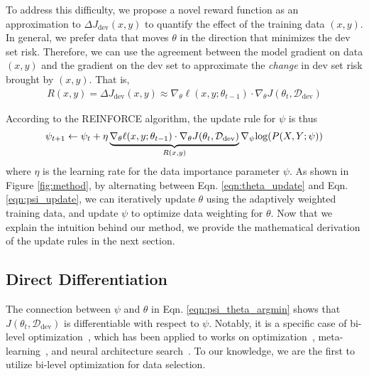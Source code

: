 To address this difficulty, we propose a novel reward function as an approximation to $\Delta J_{\text{dev}}(x, y)$ to quantify the effect of the training data $(x, y)$. In general, we prefer data that moves $\theta$ in the direction that minimizes the dev set risk. Therefore, we can use the agreement between the model gradient on data $(x, y)$ and the gradient on the dev set to approximate the \textit{change} in dev set risk brought by $(x, y)$. That is, 
\begin{align}
    \label{eqn:reward_fn}
    R(x, y) = \Delta J_{\text{dev}}(x, y) \approx \nabla_\theta \ell(x, y; \theta_{t-1}) \cdot \nabla_\theta J(\theta_t, \mathcal{D}_\text{dev}) 
\end{align}

According to the REINFORCE algorithm, the update rule for $\psi$ is thus
\begin{align}
    \label{eqn:psi_update}
    \psi_{t+1} \leftarrow  \psi_t + \eta \underbrace{\nabla_\theta \ell(x, y; \theta_{t-1}) \cdot \nabla_\theta J(\theta_t, \mathcal{D}_\text{dev})}_{\mathclap{R(x, y)}} \nabla_\psi \text{log}(P(X, Y;\psi))
\end{align}
where $\eta$ is the learning rate for the data importance parameter $\psi$. As shown in Figure \ref{fig:method}, by alternating between Eqn. \ref{eqn:theta_update} and Eqn. \ref{eqn:psi_update}, we can iteratively update $\theta$ using the adaptively weighted training data, and update $\psi$ to optimize data weighting for $\theta$. Now that we explain the intuition behind our method, we provide the mathematical derivation of the update rules in the next section.  

\subsection{\label{sec:diff_data_selection}Direct Differentiation}

The connection between $\psi$ and $\theta$ in Eqn. \ref{eqn:psi_theta_argmin} shows that $J(\theta_t, \mathcal{D}_\text{dev})$ is differentiable with respect to $\psi$. Notably, it is a specific case of bi-level optimization~\citep{bilevel_optim}, which has been applied to works on optimization~\citep{hyper_grad}, meta-learning~\citep{finn2017model}, and neural architecture search~\citep{darts}. To our knowledge, we are the first to utilize bi-level optimization for data selection. 

